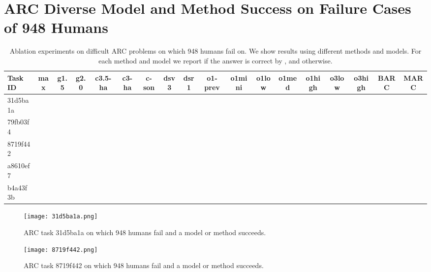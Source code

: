 \section{ARC Diverse Model and Method Success on Failure Cases of 948 Humans}
\label{appendix:Q}

\begin{table*}[htb]
  \centering
  \tiny
\caption{Ablation experiments on difficult ARC problems on which 948 humans fail on. We show results using different methods and models. For each method and model we report if the answer is correct by \C, and \X otherwise.}
\begin{tabular}{l|ccccccccccccccccc}
\toprule
\textbf{Task ID} & 
\textbf{max} &
\textbf{g1.5} &
\textbf{g2.0} &
\textbf{c3.5-ha} &
\textbf{c3-ha} &
\textbf{c-son} &
\textbf{dsv3} &
\textbf{dsr1} &
\textbf{o1-prev} &
\textbf{o1mini} &
\textbf{o1low} &
\textbf{o1med} &
\textbf{o1high} &
\textbf{o3low} &
\textbf{o3high} &
\textbf{BARC} &
\textbf{MARC} \\
\midrule
31d5ba1a  & \C & \X & \X & \X & \X & \X & \X & \C & \C & \C & \C & \C & \C & \C & \C & \C & \C\\
79fb03f4  & \X & \X & \X & \X & \X & \X & \X & \X & \X & \X & \X & \X & \X & \X & \X & \X & \X\\
8719f442  & \C & \X & \X & \X & \X & \X & \X & \X & \X & \X & \X & \X & \X & \C & \C & \X & \X\\
a8610ef7  & \C & \X & \X & \X & \X & \X & \X & \X & \X & \X & \X & \X & \X & \X & \C & \C & \X\\
b4a43f3b  & \C & \X & \X & \X & \X & \X & \X & \X & \X & \X & \X & \X & \X & \C & \C & \X & \X\\
\bottomrule
\end{tabular}
\label{tab:ARCo3fails}
\vspace{-10pt}
\end{table*}


\begin{figure}[H]
    \centering
    \texttt{[image: 31d5ba1a.png]}
    \label{fig:ARCeval}
    \caption{ARC task 31d5ba1a on which 948 humans fail and a model or method succeeds.}
\end{figure}

\begin{figure}[H]
    \centering
    \texttt{[image: 8719f442.png]}
    \label{fig:ARCeval}
    \caption{ARC task 8719f442 on which 948 humans fail and a model or method succeeds.}
\end{figure}

